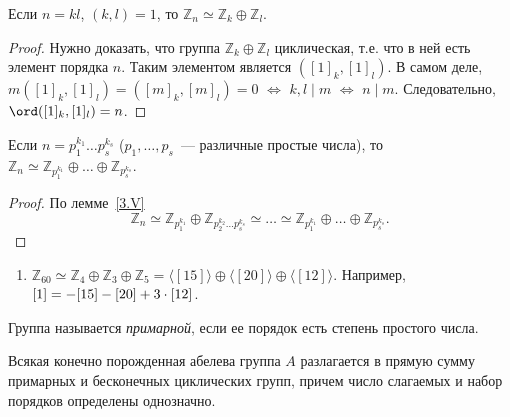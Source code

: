 \documentclass[a4paper]{article}
\newcommand*{\p}[1]{#1\nobreak\discretionary{}{\hbox{$\mathsurround=0pt #1$}}{}}
\begin{document}
\begin{lemma}
\label{3.V}Если $n=kl$, $(k,l)=1$, то
$\mathbb{Z}_n\simeq\mathbb{Z}_k\oplus\mathbb{Z}_l$.
\end{lemma}

\begin{proof}
Нужно доказать, что группа $\mathbb{Z}_k\oplus\mathbb{Z}_l$
циклическая, т.е. что в ней есть элемент порядка $n$. Таким
элементом является $([1]_k,[1]_l)$. В самом деле,
$m([1]_k,[1]_l)=([m]_k,[m]_l)=0$ $\Leftrightarrow$ $k,l\mid m$
$\Leftrightarrow$ $n\mid m$. Следовательно, $\ord([1]_k,[1]_l)=n$.
\end{proof}

\begin{theorem}
Если $n=p_1^{k_1}\ldots p_s^{k_s}$ ($p_1,\ldots,p_s$~--- различные
простые числа), то
$\mathbb{Z}_n\simeq\mathbb{Z}_{p_1^{k_1}}\oplus\ldots\oplus\mathbb{Z}_{p_s^{k_s}}$.
\end{theorem}

\begin{proof}
По лемме~\ref{3.V}$$\mathbb{Z}_n\simeq\mathbb{Z}_{p_1^{k_1}}\oplus
\mathbb{Z}_{p_2^{k_2}\ldots
p_s^{k_s}}\simeq\ldots\simeq\mathbb{Z}_{p_1^{k_1}}\oplus \ldots
\oplus\mathbb{Z}_{p_s^{k_s}}.$$
\end{proof}

\begin{ex}
\begin{enumerate}
  \item $\mathbb{Z}_{60}\simeq \mathbb{Z}_4\oplus\mathbb{Z}_3\oplus\mathbb{Z}_5=
  \langle[15]\rangle\oplus\langle[20]\rangle\oplus\langle[12]\rangle$.
  Например, $[1]=-[15]\p-[20]+3\cdot[12]$.
\end{enumerate}
\end{ex}
Группа называется \emph{примарной}, если ее порядок есть степень
простого числа.

\begin{theorem}
Всякая конечно порожденная абелева группа $A$ разлагается в прямую
сумму примарных и бесконечных циклических групп, причем число
слагаемых и набор порядков определены однозначно.
\end{theorem}
\end{document}
